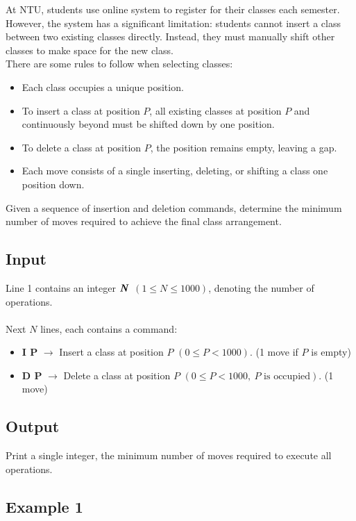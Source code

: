 \documentclass[12pt,a4paper]{article}
\begin{document}
\noindent
At NTU, students use online system to register for their classes each semester. However, the system has a significant limitation: students cannot insert a class between two existing classes directly. Instead, they must manually shift other classes to make space for the new class.
\\
\noindent
There are some rules to follow when selecting classes:
\begin{itemize}
    \item Each class occupies a unique position.
    \item To insert a class at position \textbf{\( P \)}, all existing classes at position \textbf{\( P \)} and continuously beyond must be shifted down by one position.
    \item To delete a class at position \textbf{\( P \)}, the position remains empty, leaving a gap.
    \item Each move consists of a single inserting, deleting, or shifting a class one position down.
\end{itemize}

\noindent
Given a sequence of insertion and deletion commands, determine the minimum number of moves required to achieve the final class arrangement.

\subsection*{\fontsize{16}{12}Input}
Line 1 contains an integer \(\textbf{\textit{N}}\) \((1 \leq N \leq 1000)\), denoting the number of operations.
\\\\
\noindent
Next \textbf{\( N \)} lines, each contains a command:
    \begin{itemize}
        \item \textbf{I P} $\rightarrow$ Insert a class at position \( P \) \((0 \leq P < 1000)\). (1 move if $P$ is empty)
        \item \textbf{D P} $\rightarrow$ Delete a class at position \( P \) \((0 \leq P < 1000,\ P\text{ is occupied})\). (1 move)
    \end{itemize}

\subsection*{\fontsize{16}{12}Output}
Print a single integer, the minimum number of moves required to execute all operations.
\subsection*{\fontsize{16}{12}Example 1}
\end{document}
